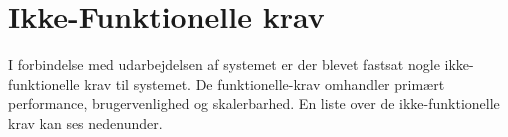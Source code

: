


\section{Ikke-Funktionelle krav}
I forbindelse med udarbejdelsen af systemet er der blevet fastsat nogle ikke-funktionelle krav til systemet. De funktionelle-krav omhandler primært performance, brugervenlighed og skalerbarhed. En liste over de ikke-funktionelle krav kan ses nedenunder.
